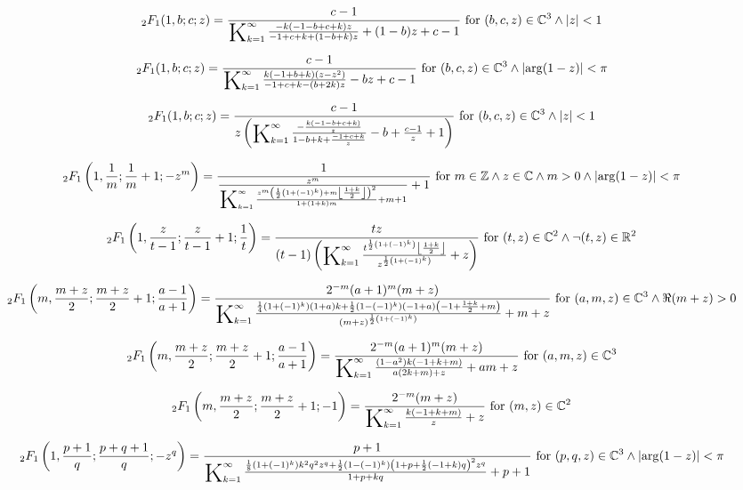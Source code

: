\documentclass{article}
\newcommand{\bigK}{\mathop{\raisebox{-5pt}{\huge K}}}
\begin{document}
\[\, _2F_1(1,b;c;z)=\frac{c-1}{\bigK_{k=1}^{\infty}\frac{-k (-1-b+c+k) z}{-1+c+k+(1-b+k) z}+(1-b) z+c-1}\text{ for }(b,c,z)\in \mathbb{C}^3\land \left| z\right| <1\] 

\[\, _2F_1(1,b;c;z)=\frac{c-1}{\bigK_{k=1}^{\infty}\frac{k (-1+b+k) \left(z-z^2\right)}{-1+c+k-(b+2 k) z}-b z+c-1}\text{ for }(b,c,z)\in \mathbb{C}^3\land \left| \arg (1-z)\right| <\pi\] 

\[\, _2F_1(1,b;c;z)=\frac{c-1}{z \left(\bigK_{k=1}^{\infty}\frac{-\frac{k (-1-b+c+k)}{z}}{1-b+k+\frac{-1+c+k}{z}}-b+\frac{c-1}{z}+1\right)}\text{ for }(b,c,z)\in \mathbb{C}^3\land \left| z\right| <1\] 

\[\, _2F_1\left(1,\frac{1}{m};\frac{1}{m}+1;-z^m\right)=\frac{1}{\frac{z^m}{\bigK_{k=1}^{\infty}\frac{z^m \left(\frac{1}{2} \left(1+(-1)^k\right)+m \left\lfloor \frac{1+k}{2}\right\rfloor \right)^2}{1+(1+k) m}+m+1}+1}\text{ for }m\in \mathbb{Z}\land z\in \mathbb{C}\land m>0\land \left| \arg (1-z)\right| <\pi\] 

\[\, _2F_1\left(1,\frac{z}{t-1};\frac{z}{t-1}+1;\frac{1}{t}\right)=\frac{t z}{(t-1) \left(\bigK_{k=1}^{\infty}\frac{t^{\frac{1}{2} \left(1+(-1)^k\right)} \left\lfloor \frac{1+k}{2}\right\rfloor }{z^{\frac{1}{2} \left(1+(-1)^k\right)}}+z\right)}\text{ for }(t,z)\in \mathbb{C}^2\land \neg (t,z)\in \mathbb{R}^2\] 

\[\, _2F_1\left(m,\frac{m+z}{2};\frac{m+z}{2}+1;\frac{a-1}{a+1}\right)=\frac{2^{-m} (a+1)^m (m+z)}{\bigK_{k=1}^{\infty}\frac{\frac{1}{4} \left(1+(-1)^k\right) (1+a) k+\frac{1}{2} \left(1-(-1)^k\right) (-1+a) \left(-1+\frac{1+k}{2}+m\right)}{(m+z)^{\frac{1}{2} \left(1+(-1)^k\right)}}+m+z}\text{ for }(a,m,z)\in \mathbb{C}^3\land \Re(m+z)>0\] 

\[\, _2F_1\left(m,\frac{m+z}{2};\frac{m+z}{2}+1;\frac{a-1}{a+1}\right)=\frac{2^{-m} (a+1)^m (m+z)}{\bigK_{k=1}^{\infty}\frac{\left(1-a^2\right) k (-1+k+m)}{a (2 k+m)+z}+a m+z}\text{ for }(a,m,z)\in \mathbb{C}^3\] 

\[\, _2F_1\left(m,\frac{m+z}{2};\frac{m+z}{2}+1;-1\right)=\frac{2^{-m} (m+z)}{\bigK_{k=1}^{\infty}\frac{k (-1+k+m)}{z}+z}\text{ for }(m,z)\in \mathbb{C}^2\] 

\[\, _2F_1\left(1,\frac{p+1}{q};\frac{p+q+1}{q};-z^q\right)=\frac{p+1}{\bigK_{k=1}^{\infty}\frac{\frac{1}{8} \left(1+(-1)^k\right) k^2 q^2 z^q+\frac{1}{2} \left(1-(-1)^k\right) \left(1+p+\frac{1}{2} (-1+k) q\right)^2 z^q}{1+p+k q}+p+1}\text{ for }(p,q,z)\in \mathbb{C}^3\land \left| \arg (1-z)\right| <\pi\] 
\end{document}
